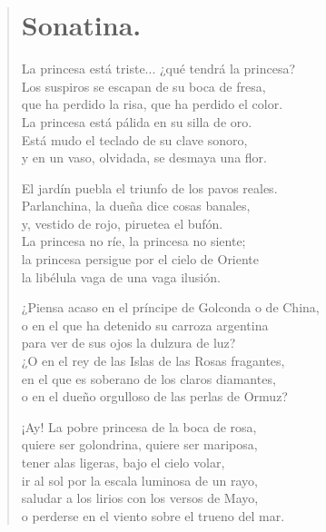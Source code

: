 \documentclass[12pt, twoside]{book}
\begin{document}
\begin{verse}
\begin{center}
\section{Sonatina.}
\end{center}

La princesa está triste... ¿qué tendrá la princesa?\\
Los suspiros se escapan de su boca de fresa,\\
que ha perdido la risa, que ha perdido el color.\\
La princesa está pálida en su silla de oro.\\
Está mudo el teclado de su clave sonoro,\\
y en un vaso, olvidada, se desmaya una flor.\newline

El jardín puebla el triunfo de los pavos reales.\\
Parlanchina, la dueña dice cosas banales,\\
y, vestido de rojo, piruetea el bufón.\\
La princesa no ríe, la princesa no siente;\\
la princesa persigue por el cielo de Oriente\\
la libélula vaga de una vaga ilusión.\newline

¿Piensa acaso en el príncipe de Golconda o de China,\\
o en el que ha detenido su carroza argentina\\
para ver de sus ojos la dulzura de luz?\\
¿O en el rey de las Islas de las Rosas fragantes,\\
en el que es soberano de los claros diamantes,\\
o en el dueño orgulloso de las perlas de Ormuz?\newline

¡Ay! La pobre princesa de la boca de rosa,\\
quiere ser golondrina, quiere ser mariposa,\\
tener alas ligeras, bajo el cielo volar,\\
ir al sol por la escala luminosa de un rayo,\\
saludar a los lirios con los versos de Mayo,\\
o perderse en el viento sobre el trueno del mar.\newpage


\end{verse}
\end{document}
